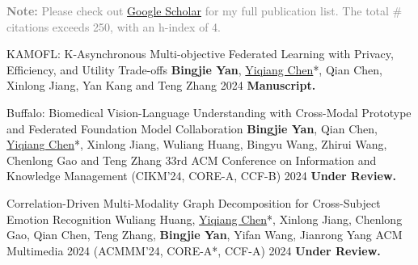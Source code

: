 

\begin{cvparagraph}
\textcolor{gray}{\textbf{Note:} Please check out \href{https://scholar.google.com/citations?hl=en&user=DVsgN1sAAAAJ}{Google Scholar} for my full publication list.
The total \# citations exceeds 250, with an h-index of 4.}
\end{cvparagraph}
\vspace{-1.0mm}
\begin{cvpublications}

\cvpublication
{KAMOFL: K-Asynchronous Multi-objective Federated Learning with Privacy, Efficiency, and Utility Trade-offs} %
{\textbf{Bingjie Yan}, \underline{Yiqiang Chen}*, Qian Chen, Xinlong Jiang, Yan Kang and Teng Zhang} %
{} %
{2024} %
{\textbf{Manuscript.}} %

\cvpublication
{Buffalo: Biomedical Vision-Language Understanding with Cross-Modal Prototype and Federated Foundation Model Collaboration} %
{\textbf{Bingjie Yan}, Qian Chen, \underline{Yiqiang Chen}*, Xinlong Jiang, Wuliang Huang, Bingyu Wang, Zhirui Wang, Chenlong Gao and Teng Zhang} %
{33rd ACM Conference on Information and Knowledge Management (CIKM'24, CORE-A, CCF-B)} %
{2024} %
{\textbf{Under Review.}} %


\cvpublication
{Correlation-Driven Multi-Modality Graph Decomposition for Cross-Subject Emotion Recognition} %
{Wuliang Huang, \underline{Yiqiang Chen}*, Xinlong Jiang, Chenlong Gao, Qian Chen, Teng Zhang, \textbf{Bingjie Yan}, Yifan Wang, Jianrong Yang} %
{ACM Multimedia 2024 (ACMMM'24, CORE-A*, CCF-A)} %
{2024} %
{\textbf{Under Review.}} %

\end{cvpublications}

